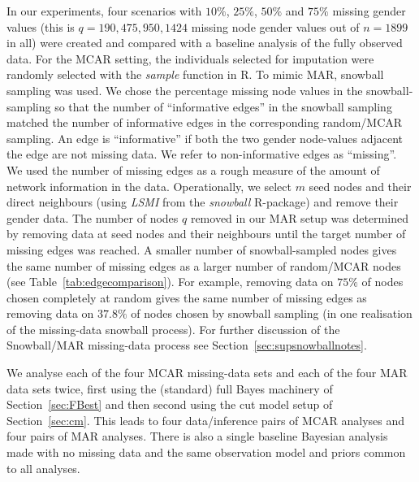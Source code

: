 \documentclass{article}
\begin{document}
In our experiments, four scenarios with $10\%$, $25\%$, $50\%$ and $75\%$ missing gender values (this is $q=190,475,950,1424$ missing node gender values out of $n=1899$ in all) were created and compared with a baseline analysis of the fully observed data. For the MCAR setting, the individuals selected for imputation were randomly selected with the \textit{sample} function in R. To mimic MAR, snowball sampling was used. We chose the percentage missing node values in the snowball-sampling so that the number of ``informative edges'' in the snowball sampling matched the number of informative edges in the corresponding random/MCAR sampling. An edge is ``informative'' if both the two gender node-values adjacent the edge are not missing data. We refer to non-informative edges as ``missing''.
We used the number of missing edges as a rough measure of the amount of network information in the data. Operationally, we select $m$ seed nodes and their direct neighbours (using \textit{LSMI} from the \textit{snowball} R-package) and remove their gender data. The number of nodes $q$ removed in our MAR setup was determined by removing data at seed nodes and their neighbours until the target number of missing edges was reached. A smaller number of snowball-sampled nodes gives the same number of missing edges as a larger number of random/MCAR nodes (see Table~\ref{tab:edgecomparison}). For example, removing data on $75\%$ of nodes chosen completely at random gives the same number of missing edges as removing data on $37.8\%$ of nodes chosen by snowball sampling (in one realisation of the missing-data snowball process). For further discussion of the Snowball/MAR missing-data process see Section~\ref{sec:supsnowballnotes}.

We analyse each of the four MCAR missing-data sets and each of the four MAR data sets twice,
first using the (standard) full Bayes machinery of 
Section~\ref{sec:FBest} and then second using the cut model setup of Section~\ref{sec:cm}.
This leads to four data/inference pairs of MCAR analyses and four pairs of MAR analyses. 
There is also a single baseline Bayesian 
analysis made with no missing data and the same observation model and priors common to all analyses. 
\end{document}
